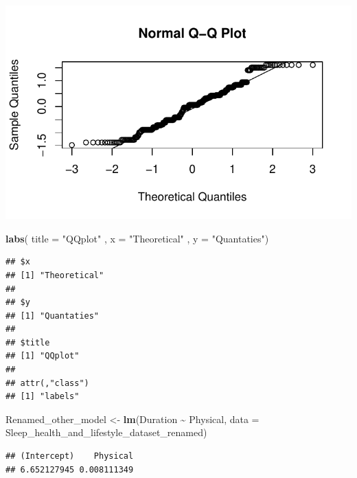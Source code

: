 \documentclass[
  11pt,
]{article}
\newenvironment{Shaded}{\begin{snugshade}}{\end{snugshade}}
\newcommand{\AttributeTok}[1]{\textcolor[rgb]{0.13,0.29,0.53}{#1}}
\newcommand{\FunctionTok}[1]{\textcolor[rgb]{0.13,0.29,0.53}{\textbf{#1}}}
\newcommand{\NormalTok}[1]{#1}
\newcommand{\OtherTok}[1]{\textcolor[rgb]{0.56,0.35,0.01}{#1}}
\newcommand{\SpecialCharTok}[1]{\textcolor[rgb]{0.81,0.36,0.00}{\textbf{#1}}}
\newcommand{\StringTok}[1]{\textcolor[rgb]{0.31,0.60,0.02}{#1}}
\begin{document}
\begin{center}\includegraphics[width=0.7\linewidth]{SleepHelath_files/figure-latex/unnamed-chunk-26-1} \end{center}

\begin{Shaded}
\begin{Highlighting}[]
\FunctionTok{labs}\NormalTok{( }\AttributeTok{title  =} \StringTok{"QQplot"}\NormalTok{ , }\AttributeTok{x =} \StringTok{"Theoretical"}\NormalTok{ , }\AttributeTok{y =} \StringTok{"Quantaties"}\NormalTok{)}
\end{Highlighting}
\end{Shaded}

\begin{verbatim}
## $x
## [1] "Theoretical"
## 
## $y
## [1] "Quantaties"
## 
## $title
## [1] "QQplot"
## 
## attr(,"class")
## [1] "labels"
\end{verbatim}

\begin{Shaded}
\begin{Highlighting}[]
\NormalTok{Renamed\_other\_model }\OtherTok{\textless{}{-}} \FunctionTok{lm}\NormalTok{(Duration }\SpecialCharTok{\textasciitilde{}}\NormalTok{ Physical, }\AttributeTok{data =}\NormalTok{ Sleep\_health\_and\_lifestyle\_dataset\_renamed)}
\end{Highlighting}
\end{Shaded}

\begin{Shaded}
\end{Shaded}

\begin{verbatim}
## (Intercept)    Physical 
## 6.652127945 0.008111349
\end{verbatim}
\end{document}
